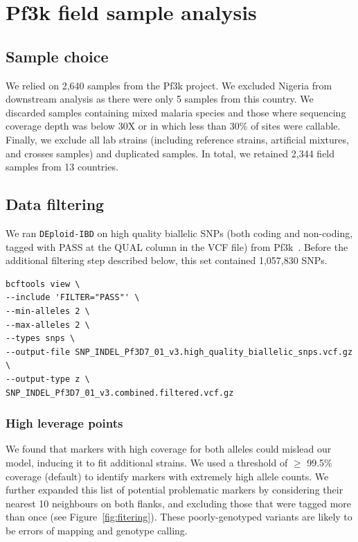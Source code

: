 \documentclass[9pt]{article}
\begin{document}
\newpage

\section{Pf3k field sample analysis}
\subsection{Sample choice}
We relied on 2,640 samples from the Pf3k project. We excluded Nigeria from downstream analysis as there were only 5 samples from this country.
We discarded samples containing mixed malaria species and those where sequencing coverage depth was below 30X or in which less than 30\% of sites were callable. Finally, we exclude all lab strains (including reference strains, artificial mixtures, and crosses samples) and duplicated samples. In total, we retained 2,344 field samples from 13 countries.

\subsection{Data filtering}
We ran {\tt DEploid-IBD} on high quality biallelic SNPs (both coding and non-coding, tagged with PASS at the QUAL column in the VCF file) from Pf3k~\citep{pf3k}. Before the additional filtering step described below, this set contained 1,057,830 SNPs.
\linespread{1}
\begin{lstlisting}
bcftools view \
--include 'FILTER="PASS"' \
--min-alleles 2 \
--max-alleles 2 \
--types snps \
--output-file SNP_INDEL_Pf3D7_01_v3.high_quality_biallelic_snps.vcf.gz \
--output-type z \
SNP_INDEL_Pf3D7_01_v3.combined.filtered.vcf.gz
\end{lstlisting}

\subsubsection{High leverage points}

We found that markers with high coverage for both alleles could mislead our model, inducing it to fit additional strains. We used a threshold of $\geq$ 99.5\% coverage (default) to identify markers with extremely high allele counts. We further expanded this list of potential problematic markers by considering their nearest 10 neighbours on both flanks, and excluding those that were tagged more than once (see Figure~\ref{fig:fitering}). These poorly-genotyped variants are likely to be errors of mapping and genotype calling.
\end{document}

